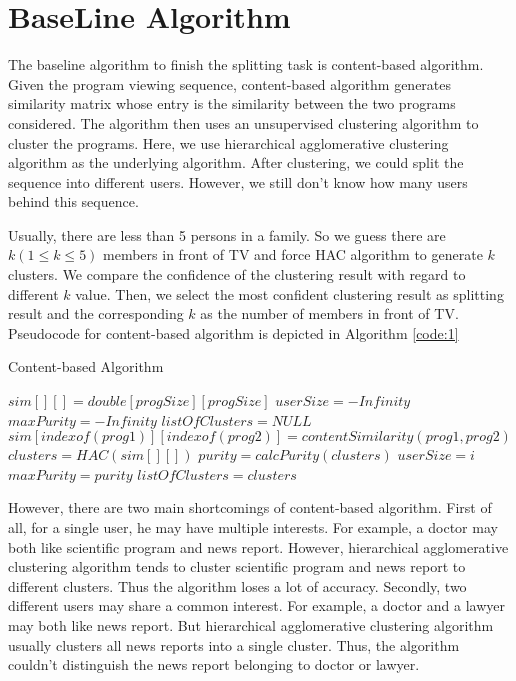 \section{BaseLine Algorithm}
The baseline algorithm to finish the splitting task is content-based algorithm. Given the program viewing sequence, content-based algorithm
generates similarity matrix whose entry is the similarity between the two programs considered. The algorithm then uses an unsupervised
clustering algorithm to cluster the programs. Here, we use hierarchical agglomerative clustering algorithm as the underlying algorithm.
After clustering, we could split the sequence into different users. However, we still don't know how many users behind this sequence.

Usually, there are less than 5 persons in a family. So we guess there are $k(1 \leq k \leq 5)$ members in front of TV and force HAC\cite{DBLP:conf/icpr/Gil-GarciaBP06}
algorithm to generate $k$ clusters. We compare the confidence of the clustering result with regard to different $k$ value. Then, we select the most
confident clustering result as splitting result and the corresponding $k$ as the number of members in front of TV.
Pseudocode for content-based algorithm is depicted in Algorithm \ref{code:1}

\begin{algorithm}[htb]
\caption{Content-based Algorithm}
\label{code:1}
\begin{algorithmic}[1]
\STATE $sim[][] = double[progSize][progSize]$
\STATE $userSize = -Infinity$
\STATE $maxPurity = -Infinity$
\STATE $listOfClusters = NULL$
\STATE $sim[indexof(prog1)][indexof(prog2)] = contentSimilarity(prog1,prog2)$
\ENDFOR
\ENDFOR
\STATE $clusters = HAC(sim[][])$
\STATE $purity = calcPurity(clusters)$
\STATE $userSize = i$
\STATE $maxPurity = purity$
\STATE $listOfClusters = clusters$
\ENDIF
\ENDFOR
\end{algorithmic}
\end{algorithm}

However, there are two main shortcomings of content-based algorithm. First of all, for a single user, he may have multiple interests. For example,
a doctor may both like scientific program and news report. However, hierarchical agglomerative clustering algorithm tends to cluster scientific
program and news report to different clusters. Thus the algorithm loses a lot of accuracy. Secondly, two different users may share a common interest.
For example, a doctor and a lawyer may both like news report. But hierarchical agglomerative clustering algorithm usually clusters all news reports into
a single cluster. Thus, the algorithm couldn't distinguish the news report belonging to doctor or lawyer.
